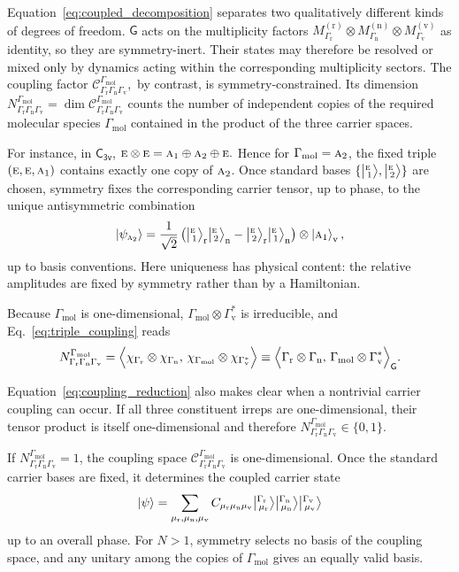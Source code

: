 \documentclass[
  reprint,
  aps,
  prx,
  superscriptaddress,
  amsmath,
  amssymb,
  longbibliography
]{revtex4-2}
\newcommand{\grp}[1]{\mathsf{#1}}
\newcommand{\irr}[1]{\text{\normalfont\scshape #1}}
\newcommand{\irket}[2]{\bigl\lvert{}^{#1}_{\,#2}\bigr\rangle}
\providecommand{\Gmol}{\Gamma_{\mathrm{mol}}}
\providecommand{\Grot}{\Gamma_{\mathrm{r}}}
\providecommand{\Gvib}{\Gamma_{\mathrm{v}}}
\providecommand{\Gspin}{\Gamma_{\mathrm{n}}}
\begin{document}
Equation~\eqref{eq:coupled_decomposition} separates two qualitatively different kinds of degrees of freedom. \(\grp{G}\) acts on the multiplicity factors
\(
M^{(\mathrm r)}_{\Grot}
\otimes
M^{(\mathrm n)}_{\Gspin}
\otimes
M^{(\mathrm v)}_{\Gvib}
\)
as identity, so they are symmetry-inert. Their states may therefore be resolved or mixed only by dynamics acting within the corresponding multiplicity sectors. The coupling factor
\(
\mathcal C^{\Gmol}_{\Grot\Gspin\Gvib},
\)
by contrast, is symmetry-constrained. Its dimension
\(
N^{\Gmol}_{\Grot\Gspin\Gvib}
=
\dim
\mathcal C^{\Gmol}_{\Grot\Gspin\Gvib}
\)
counts the number of independent copies of the required molecular species \(\Gmol\) contained in the product of the three carrier spaces.

For instance, in \(\grp{C_{3v}}\),
\(
\irr{e}\otimes\irr{e}=\irr{a}_{1}\oplus\irr{a}_{2}\oplus\irr{e}.
\)
Hence for \(\Gmol=\irr{a}_{2}\), the fixed triple
\(
(\irr{e},\irr{e},\irr{a}_{1})
\)
contains exactly one copy of \(\irr{a}_{2}\). Once standard bases
\(\{\irket{\irr{e}}{1},\irket{\irr{e}}{2}\}\) are chosen, symmetry fixes the corresponding carrier tensor, up to phase, to the unique antisymmetric combination
\[
\ket{\psi_{\irr{a}_{2}}}
=
\frac{1}{\sqrt{2}}
\left(
\irket{\irr{e}}{1}_{\mathrm r}\irket{\irr{e}}{2}_{\mathrm n}
-
\irket{\irr{e}}{2}_{\mathrm r}\irket{\irr{e}}{1}_{\mathrm n}
\right)
\otimes\ket{\irr{a}_{1}}_{\mathrm v},
\]
up to basis conventions. Here uniqueness has physical content: the relative amplitudes are fixed by symmetry rather than by a Hamiltonian.


Because $\Gmol$ is one-dimensional, $\Gmol\otimes\Gvib^{*}$ is irreducible, and Eq.~\eqref{eq:triple_coupling} reads
\begin{equation}
N^{\Gmol}_{\Grot\Gspin\Gvib}
=
\Bigl\langle
\chi_{\Grot}\otimes\chi_{\Gspin},
\,
\chi_{\Gmol}\otimes\chi_{\Gvib^{*}}
\Bigr\rangle
\equiv
\Bigl\langle
\Grot\otimes\Gspin,
\,
\Gmol\otimes\Gvib^{*}
\Bigr\rangle_{\grp{G}}.
\label{eq:coupling_reduction}
\end{equation}

Equation~\eqref{eq:coupling_reduction} also makes clear when a nontrivial carrier coupling can occur. If all three constituent irreps are one-dimensional, their tensor product is itself one-dimensional and therefore
\(
N^{\Gmol}_{\Grot\Gspin\Gvib}
\in\{0,1\}.
\)

If $N^{\Gmol}_{\Grot\Gspin\Gvib}=1$, the coupling space $\mathcal C^{\Gmol}_{\Grot\Gspin\Gvib}$ is one-dimensional. Once the standard carrier bases are fixed, it determines the coupled carrier state
\begin{equation}
\ket{\psi}
=
\sum_{\mu_{\mathrm r},\mu_{\mathrm n},\mu_{\mathrm v}}
C_{\mu_{\mathrm r}\mu_{\mathrm n}\mu_{\mathrm v}}
\irket{\Grot}{\mu_{\mathrm r}}
\irket{\Gspin}{\mu_{\mathrm n}}
\irket{\Gvib}{\mu_{\mathrm v}}
\label{eq:unique_coupled_state}
\end{equation}
up to an overall phase. For $N>1$, symmetry selects no basis of the coupling space, and any unitary among the copies of $\Gmol$ gives an equally valid basis.
\end{document}
